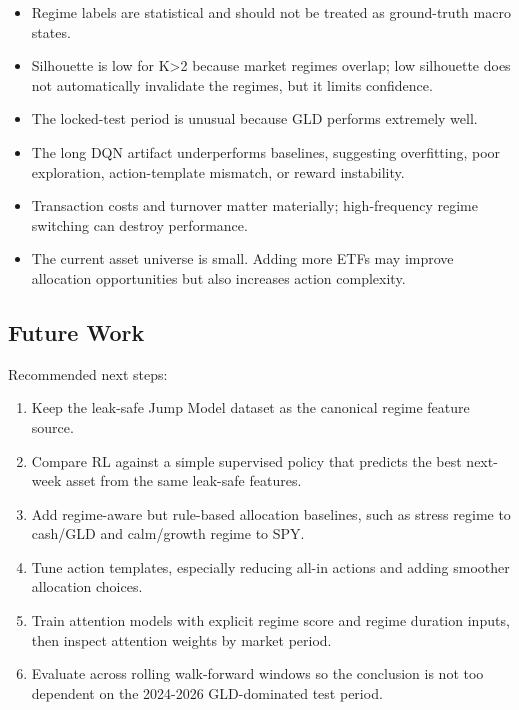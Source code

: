 \begin{itemize}
\tightlist
\item
  Regime labels are statistical and should not be treated as
  ground-truth macro states.
\item
  Silhouette is low for K\textgreater2 because market regimes overlap;
  low silhouette does not automatically invalidate the regimes, but it
  limits confidence.
\item
  The locked-test period is unusual because GLD performs extremely well.
\item
  The long DQN artifact underperforms baselines, suggesting overfitting,
  poor exploration, action-template mismatch, or reward instability.
\item
  Transaction costs and turnover matter materially; high-frequency
  regime switching can destroy performance.
\item
  The current asset universe is small. Adding more ETFs may improve
  allocation opportunities but also increases action complexity.
\end{itemize}

\subsection{Future Work}\label{future-work}

Recommended next steps:

\begin{enumerate}
\def\labelenumi{\arabic{enumi}.}
\tightlist
\item
  Keep the leak-safe Jump Model dataset as the canonical regime feature
  source.
\item
  Compare RL against a simple supervised policy that predicts the best
  next-week asset from the same leak-safe features.
\item
  Add regime-aware but rule-based allocation baselines, such as stress
  regime to cash/GLD and calm/growth regime to SPY.
\item
  Tune action templates, especially reducing all-in actions and adding
  smoother allocation choices.
\item
  Train attention models with explicit regime score and regime duration
  inputs, then inspect attention weights by market period.
\item
  Evaluate across rolling walk-forward windows so the conclusion is not
  too dependent on the 2024-2026 GLD-dominated test period.
\end{enumerate}

